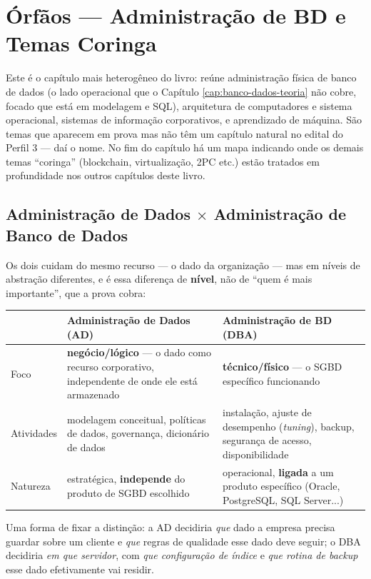 \chapter{Órfãos --- Administração de BD e Temas Coringa}
\label{cap:orfaos-teoria}

Este é o capítulo mais heterogêneo do livro: reúne administração física de
banco de dados (o lado operacional que o Capítulo \ref{cap:banco-dados-teoria}
não cobre, focado que está em modelagem e SQL), arquitetura de computadores
e sistema operacional, sistemas de informação corporativos, e aprendizado de
máquina. São temas que aparecem em prova mas não têm um capítulo natural no
edital do Perfil 3 --- daí o nome. No fim do capítulo há um mapa indicando
onde os demais temas “coringa” (blockchain, virtualização, 2PC etc.) estão
tratados em profundidade nos outros capítulos deste livro.

\section{Administração de Dados $\times$ Administração de Banco de Dados}

\begin{conceito}
Os dois cuidam do mesmo recurso --- o dado da organização --- mas em níveis
de abstração diferentes, e é essa diferença de \textbf{nível}, não de
“quem é mais importante”, que a prova cobra:

\begin{center}
\begin{tabular}{@{}p{2.2cm}p{4.6cm}p{4.6cm}@{}}
\toprule
& \textbf{Administração de Dados (AD)} & \textbf{Administração de BD (DBA)} \\
\midrule
Foco & \textbf{negócio/lógico} --- o dado como recurso corporativo,
independente de onde ele está armazenado & \textbf{técnico/físico} --- o
SGBD específico funcionando \\
Atividades & modelagem conceitual, políticas de dados, governança,
dicionário de dados & instalação, ajuste de desempenho
(\textit{tuning}), backup, segurança de acesso, disponibilidade \\
Natureza & estratégica, \textbf{independe} do produto de SGBD escolhido &
operacional, \textbf{ligada} a um produto específico (Oracle, PostgreSQL,
SQL Server...) \\
\bottomrule
\end{tabular}
\end{center}

Uma forma de fixar a distinção: a AD decidiria \textit{que} dado a empresa
precisa guardar sobre um cliente e \textit{que} regras de qualidade esse
dado deve seguir; o DBA decidiria \textit{em que servidor}, com
\textit{que configuração de índice} e \textit{que rotina de backup} esse
dado efetivamente vai residir.
\end{conceito}

